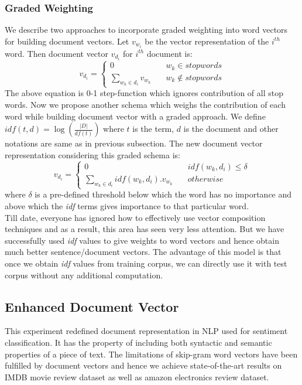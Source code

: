 \documentclass[11pt,a4paper]{article}
\begin{document}
\subsubsection{Graded Weighting}
\label{sec:graded_weighting}
We describe two approaches to incorporate graded weighting into word vectors for building document vectors. Let $v_{w_i}$ be the vector representation of the $i^{th}$ word. Then document vector $v_{d_i}$ for $i^{th}$ document is:
$$
v_{d_i} = \left\{
        \begin{array}{ll}
            0 & \quad w_k \in stopwords \\
            \sum\limits_{w_k \in d_i} v_{w_k} & \quad w_k \notin stopwords
        \end{array}
    \right.
$$
The above equation is 0-1 step-function which ignores contribution of all stop words. Now we propose another schema which weighs the contribution of each word while building document vector with a graded approach. We define $idf(t,d)=\log(\frac{|D|}{df(t)})$ where $t$ is the term, $d$ is the document and other notations are same as in previous subsection. The new document vector representation considering this graded schema is:
$$
v_{d_i} = \left\{
        \begin{array}{ll}
            0 & \quad idf(w_k,d_i) \leq \delta \\
            \sum\limits_{w_k \in d_i} idf(w_k,d_i).v_{w_k} & \quad otherwise
        \end{array}
    \right.
$$
where $\delta$ is a pre-defined threshold below which the word has no importance and above which the \emph{idf} terms gives importance to that particular word.\\
Till date, everyone has ignored how to effectively use vector composition techniques and as a result, this area has seen very less attention. But we have successfully used \emph{idf} values to give weights to word vectors and hence obtain much better sentence/document vectors. The advantage of this model is that once we obtain \emph{idf} values from training corpus, we can directly use it with test corpus without any additional computation.

\subsection{Enhanced Document Vector}
This experiment redefined document representation in NLP used for sentiment classification. It has the property of including both syntactic and semantic properties of a piece of text. The limitations of skip-gram word vectors have been fulfilled by document vectors and hence we achieve state-of-the-art results on IMDB movie review dataset as well as amazon electronics review dataset.
\end{document}
